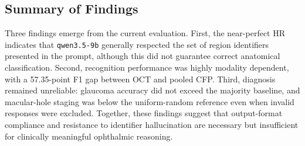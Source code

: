 \subsection{Summary of Findings}

Three findings emerge from the current evaluation.  First, the near-perfect
HR indicates that \texttt{qwen3.5-9b} generally respected the set of region
identifiers presented in the prompt, although this did not guarantee correct
anatomical classification.  Second, recognition performance was highly
modality dependent, with a 57.35-point F1 gap between OCT and pooled CFP.
Third, diagnosis remained unreliable: glaucoma
accuracy did not exceed the majority baseline, and macular-hole staging was
below the uniform-random reference even when invalid responses were excluded.
Together, these findings suggest that output-format compliance and resistance
to identifier hallucination are necessary but insufficient for clinically
meaningful ophthalmic reasoning.
